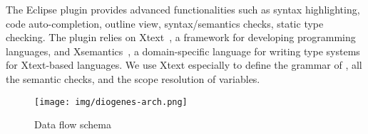 The Eclipse plugin provides advanced functionalities such as
syntax highlighting, 
code auto-completion, 
outline view,
syntax/semantics checks,
static type checking.
%
The plugin relies on
Xtext~\cite{xtext-site}, a framework for developing programming languages, 
and Xsemantics~\cite{xsemantics-site}, a domain-specific language for writing type systems
for Xtext-based languages.
%
We use Xtext especially to define the grammar of \coco,
all the semantic checks, and the scope resolution of variables.



\begin{figure}[t]
    \texttt{[image: img/diogenes-arch.png]}
    \caption{Data flow schema}
    \label{fig:architecture}
\end{figure}